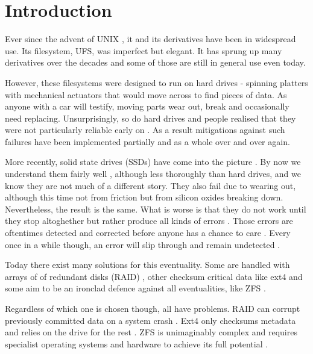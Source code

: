 \chapter*{Introduction}
    \label{ch:intro}

    Ever since the advent of UNIX \cite{UFS}, it and its derivatives have been
    in widespread use. Its filesystem, UFS, was imperfect \cite{FFS} but
    elegant. It has sprung up many derivatives \cite{FFS, LFS, WAFL,
    ext4_origin, ZFS, XFS_scalability} over the decades and some of those are
    still in general use even today.

    However, these filesystems were designed to run on hard drives - spinning
    platters with mechanical actuators that would move across to find pieces of
    data. As anyone with a car will testify, moving parts wear out, break and
    occasionally need replacing. Unsurprisingly, so do hard drives and people
    realised that they were not particularly reliable early on
    \cite{Backblaze_stats, hard_drive_failures, RAID,
    data_corruption_storage_stack}. As a result mitigations against such
    failures have been implemented partially \cite{FFS, ext4_docs} and as a
    whole \cite{ZFS} over and over again.

    More recently, solid state drives (SSDs) have come into the picture
    \cite{SSD_sales}. By now we understand them fairly well
    \cite{flash_error_manual}, although less thoroughly than hard drives, and
    we know they are not much of a different story. They also fail due to wearing
    out, although this time not from friction but from silicon oxides
    breaking down. Nevertheless, the result is the same. What is worse is that
    they do not work until they stop altoghether but rather produce all kinds of errors \cite{bit_error_mlc,
    bit_error_qlc, flash_large_scale}. Those errors are oftentimes detected and
    corrected before anyone has a chance to care \cite{flash_error_manual}.
    Every once in a while though, an error will slip through and remain
    undetected \cite{flash_reliability}.

    Today there exist many solutions for this eventuality. Some are handled with
    arrays of of redundant disks (RAID) \cite{RAID}, other checksum critical
    data like ext4 \cite{ext4_docs} and some aim to be an ironclad defence
    against all eventualities, like ZFS \cite{ZFS}.

    Regardless of which one is chosen though, all have problems. RAID can
    corrupt previously committed data on a system crash \cite{LWN_md_journal}.
    Ext4 only checksums metadata and relies on the drive for the rest
    \cite{ext4_docs}. ZFS is unimaginably complex \cite{ZFS_spec} and requires
    specialist operating systems and hardware to achieve its full potential
    \cite{TrueNAS_hardware_guide}.

